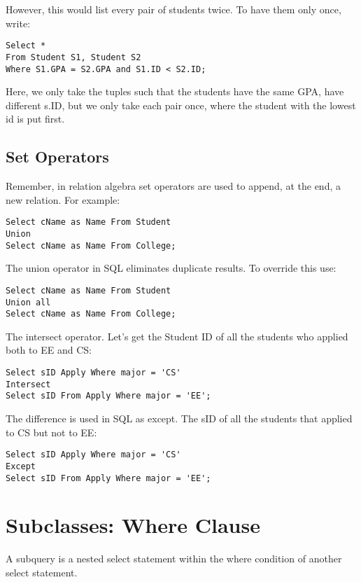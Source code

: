 \documentclass[11pt, oneside]{article}   	%
\begin{document}
However, this would list every pair of students twice. To have them only once, write:

\begin{lstlisting}
Select *
From Student S1, Student S2
Where S1.GPA = S2.GPA and S1.ID < S2.ID;
\end{lstlisting}

Here, we only take the tuples such that the students have the same GPA, have different s.ID, but we only take each pair once, where the student with the lowest id is put first. 

\subsection{Set Operators}

Remember, in relation algebra set operators are used to append, at the end, a new relation. For example:

\begin{lstlisting}
Select cName as Name From Student
Union
Select cName as Name From College;
\end{lstlisting}

The union operator in SQL eliminates duplicate results. To override this use:

\begin{lstlisting}
Select cName as Name From Student
Union all
Select cName as Name From College;
\end{lstlisting}

The intersect operator. Let's get the Student ID of all the students who applied both to EE and CS:

\begin{lstlisting}
Select sID Apply Where major = 'CS'
Intersect
Select sID From Apply Where major = 'EE';
\end{lstlisting}

The difference is used in SQL as except. The sID of all the students that applied to CS but not to EE:

\begin{lstlisting}
Select sID Apply Where major = 'CS'
Except
Select sID From Apply Where major = 'EE';
\end{lstlisting}

\section{Subclasses: Where Clause}

A subquery is a nested select statement within the where condition of another select statement. 
\end{document}
